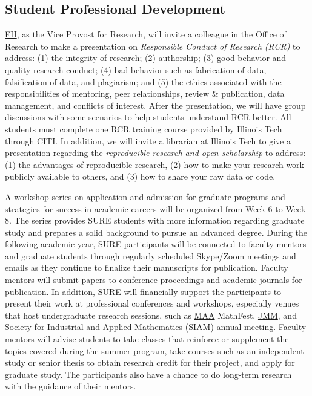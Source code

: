 \documentclass[11pt]{NSFamsart}
\newcommand{\FH}{\hyperlink{FHlink}{FH}\xspace}
\newcommand{\MAA}{\hyperlink{MAAlink}{MAA}\xspace}
\newcommand{\JMM}{\hyperlink{JMMlink}{JMM}\xspace}
\newcommand{\SIAM}{\hyperlink{SIAMlink}{SIAM}\xspace}
\begin{document}
\subsection{Student Professional Development}
\FH, as the Vice Provost for Research, will invite a colleague in the  Office of Research to make a presentation on \emph{Responsible Conduct of Research (RCR)} to address: (1) the integrity of research; (2) authorship;  (3) good behavior
and quality research conduct; (4) bad behavior such as fabrication of data, falsification of data, and
plagiarism; and (5) the ethics associated with the responsibilities of mentoring, peer relationships, review \& publication, data management, and conflicts of interest. After the presentation, we will have group discussions with some scenarios to help students understand RCR better.
All students must complete one RCR training course provided by Illinois Tech through CITI.  In addition, we will invite a librarian at Illinois Tech to give a presentation regarding the \emph{reproducible research and open scholarship} to address: (1) the advantages of  reproducible research, (2) how to make your research work publicly available to others, and
(3) how to share your raw data or code.

A workshop series on application and admission for graduate programs and strategies for success in academic careers will be organized from Week 6 to Week 8. The series provides SURE students with more information regarding graduate study and prepares a solid background to pursue an advanced degree.  During the following academic year, SURE participants will be connected to faculty mentors and graduate students through regularly scheduled Skype/Zoom meetings and emails as they continue to finalize their manuscripts for publication. Faculty mentors will submit papers to conference proceedings and academic journals for publication. In addition, SURE will financially support the participants to present their work at professional conferences and workshops, especially venues that host undergraduate research sessions, such as \MAA MathFest, \JMM, and \hypertarget{SIAMlink}{Society for Industrial and Applied Mathematics} (\SIAM) annual meeting. Faculty mentors will advise students to take classes that reinforce or supplement the topics covered during the summer program, take courses such as an independent study or senior thesis to obtain research credit for their project, and apply for graduate study.
The participants also have a chance to do long-term research with the guidance of their mentors.
\end{document}

